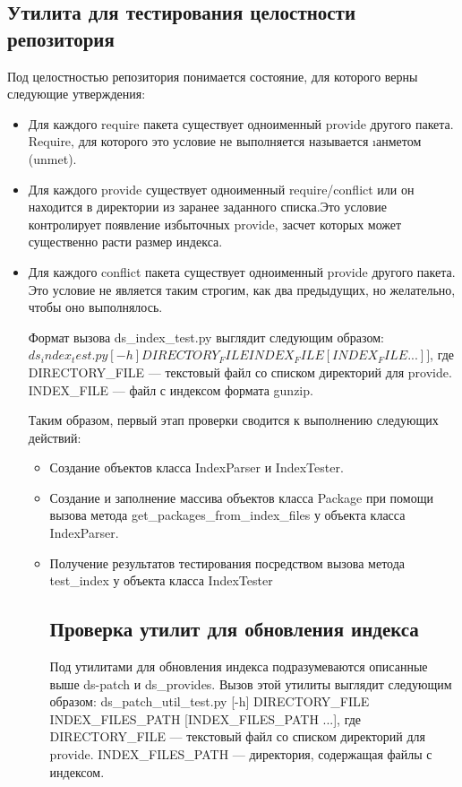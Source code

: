 \begin{enumerate}
{\subsection{Утилита для тестирования целостности репозитория}
Под целостностью репозитория понимается состояние, для которого
верны следующие утверждения:
\begin{itemize}
\item{Для каждого require пакета существует одноименный provide 
другого пакета. Require, для которого это условие не выполняется
называется \i анметом (unmet). }
\item{Для каждого provide существует одноименный require/conflict или
он находится в директории из заранее заданного списка.Это условие 
контролирует появление избыточных provide, засчет которых %
может существенно расти размер индекса.}
\item{Для каждого conflict пакета существует одноименный provide 
другого пакета. Это условие не является таким строгим, как два предыдущих,
но желательно, чтобы оно выполнялось. }

Формат вызова ds_index_test.py выглядит следующим образом:
$ds_index_test.py [-h] DIRECTORY_FILE INDEX_FILE [INDEX_FILE ...]]$, где
DIRECTORY_FILE --- текстовый файл со списком директорий для provide.
INDEX_FILE --- файл с индексом формата gunzip.

Таким образом, первый этап проверки сводится к выполнению следующих действий:
\begin{itemize}
\item{Создание объектов класса IndexParser и IndexTester.}
\item{Создание и заполнение массива объектов класса Package при помощи
вызова метода get_packages_from_index_files у объекта класса IndexParser.}
\item{Получение результатов тестирования посредством вызова метода test_index
у объекта класса IndexTester}



\subsection{Проверка утилит для обновления индекса}
Под утилитами для обновления индекса подразумеваются описанные
выше ds-patch и ds_provides.
Вызов этой утилиты выглядит следующим образом:
ds_patch_util_test.py [-h] DIRECTORY_FILE INDEX_FILES_PATH [INDEX_FILES_PATH ...], где
DIRECTORY_FILE --- текстовый файл со списком директорий для provide.
INDEX_FILES_PATH --- директория, содержащая файлы с индексом.


\end{itemize}
\end{itemize}}
\end{enumerate}
